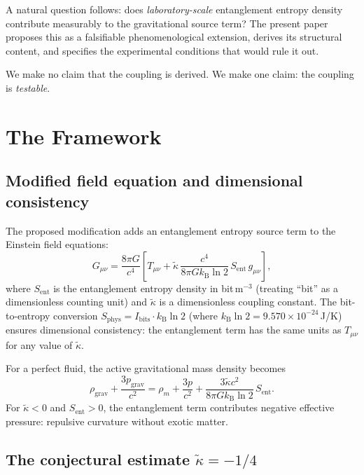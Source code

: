 \documentclass[12pt,twocolumn]{article}
\newcommand{\kB}{k_{\mathrm{B}}}
\newcommand{\kt}{\tilde{\kappa}}
\newcommand{\Sent}{S_{\mathrm{ent}}}
\begin{document}
A natural question follows: does \emph{laboratory-scale} entanglement entropy density
contribute measurably to the gravitational source term?  The present paper proposes this as a
falsifiable phenomenological extension, derives its structural content, and specifies the
experimental conditions that would rule it out.

We make no claim that the coupling is derived.  We make one claim: the coupling is
\emph{testable}.

\section{The Framework}
\label{sec:framework}

\subsection{Modified field equation and dimensional consistency}

The proposed modification adds an entanglement entropy source term to the Einstein field
equations:
\begin{equation}
  G_{\mu\nu}
  = \frac{8\pi G}{c^4}
    \left[
      T_{\mu\nu}
      + \kt\,\frac{c^4}{8\pi G\kB\ln 2}\,\Sent\,g_{\mu\nu}
    \right],
  \label{eq:modified-einstein}
\end{equation}
where $\Sent$ is the entanglement entropy density in bit\,m$^{-3}$ (treating ``bit'' as a
dimensionless counting unit) and $\kt$ is a dimensionless coupling constant.  The
bit-to-entropy conversion $S_{\mathrm{phys}} = I_{\mathrm{bits}}\cdot\kB\ln 2$
(where $\kB\ln 2 = 9.570\times10^{-24}$\,J/K) ensures dimensional consistency: the
entanglement term has the same units as $T_{\mu\nu}$ for any value of $\kt$.

For a perfect fluid, the active gravitational mass density becomes
\begin{equation}
  \rho_{\mathrm{grav}} + \frac{3p_{\mathrm{grav}}}{c^2}
  = \rho_m + \frac{3p}{c^2}
    + \frac{3\kt c^2}{8\pi G\kB\ln 2}\,\Sent.
  \label{eq:source}
\end{equation}
For $\kt < 0$ and $\Sent > 0$, the entanglement term contributes negative effective pressure:
repulsive curvature without exotic matter.

\subsection{The conjectural estimate $\kt = -1/4$}
\end{document}
